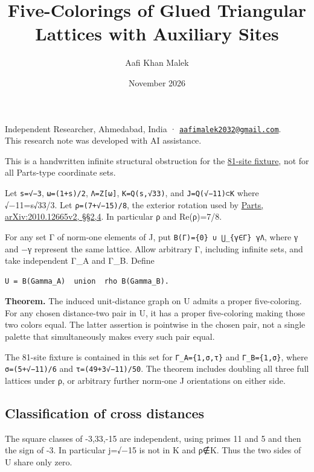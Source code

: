\documentclass[
  11pt,
]{article}
\title{Five-Colorings of Glued Triangular Lattices with Auxiliary Sites}
\author{Aafi Khan Malek}
\date{November 2026}
\begin{document}
\maketitle

Independent Researcher, Ahmedabad, India ·
\href{mailto:aafimalek2032@gmail.com}{\nolinkurl{aafimalek2032@gmail.com}}.\\
This research note was developed with AI assistance.

This is a handwritten infinite structural obstruction for the
\href{https://github.com/Aafimalek/novel-discoveries/tree/a27775bee5782ed20476b0bec59d28be5031ccde/hadwiger-nelson/verification/parts-native-field-obstruction/exterior-cross-fixture-81}{81-site
fixture}, not for all Parts-type coordinate sets.

Let \texttt{s=√−3}, \texttt{ω=(1+s)/2}, \texttt{Λ=Z{[}ω{]}},
\texttt{K=Q(s,√33)}, and \texttt{J=Q(√−11)⊂K} where √−11=s√33/3. Let
\texttt{ρ=(7+√−15)/8}, the exterior rotation used by
\href{https://arxiv.org/html/2010.12665v2\#S4}{Parts,
arXiv:2010.12665v2, §§2,4}. In particular \textbar ρ and
Re(ρ)=7/8.

For any set Γ of norm-one elements of J, put
\texttt{B(Γ)=\{0\}\ ∪\ ⋃\_\{γ∈Γ\}\ γΛ}, where γ and −γ represent the
same lattice. Allow arbitrary Γ, including infinite sets, and take
independent Γ\_A and Γ\_B. Define

\begin{verbatim}
U = B(Gamma_A)  union  rho B(Gamma_B).
\end{verbatim}

\textbf{Theorem.} The induced unit-distance graph on U admits a proper
five-coloring. For any chosen distance-two pair in U, it has a proper
five-coloring making those two colors equal. The latter assertion is
pointwise in the chosen pair, not a single palette that simultaneously
makes every such pair equal.

The 81-site fixture is contained in this set for \texttt{Γ\_A=\{1,σ,τ\}}
and \texttt{Γ\_B=\{1,σ\}}, where \texttt{σ=(5+√−11)/6} and
\texttt{τ=(49+3√−11)/50}. The theorem includes doubling all three full
lattices under ρ, or arbitrary further norm-one J orientations on either
side.

\subsection{Classification of cross
distances}\label{classification-of-cross-distances}

The square classes of -3,33,-15 are independent, using primes 11 and 5
and then the sign of -3. In particular j=√−15 is not in K and ρ∉K. Thus
the two sides of U share only zero.
\end{document}
